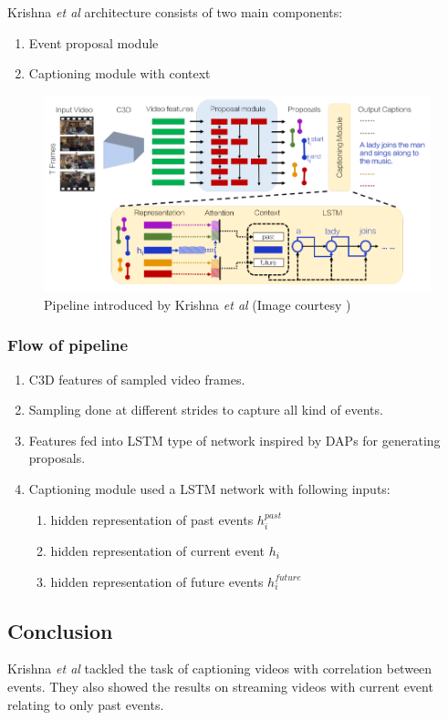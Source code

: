 \par Krishna \textit{et al} architecture consists of two main components:
\begin{enumerate}
	\item Event proposal module
	\item Captioning module with context
\end{enumerate}

\begin{figure}[h]
	\includegraphics[width=\linewidth]{assets/img/krishna2017densecaptioning-architecture.png}
	\caption{Pipeline introduced by Krishna \textit{et al} (Image courtesy \cite{krishna2017densecaptioning})}
\end{figure}

\subsubsection{Flow of pipeline}
\begin{enumerate}
	\item C3D features of sampled video frames.
	\item Sampling done at different strides to capture all kind of events.
	\item Features fed into LSTM type of network inspired by DAPs\cite{Escorcia2016DAPsDA} for generating proposals.
	\item Captioning module used a LSTM network with following inputs:
	\begin{enumerate}
		\item hidden representation of past events $h_i^{past}$
		\item hidden representation of current event $h_i$
		\item hidden representation of future events $h_i^{future}$
	\end{enumerate}
\end{enumerate}


\subsection{Conclusion}

\par Krishna \textit{et al} tackled the task of captioning videos with correlation between events. They also showed the results on streaming videos with current event relating to only past events.